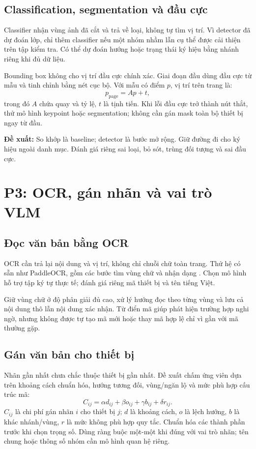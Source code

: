 \documentclass[11pt,a4paper]{article}
\newcommand{\decision}[1]{\par\smallskip\noindent\colorbox{Pale}{\parbox{\dimexpr\linewidth-2\fboxsep\relax}{\textbf{Đề xuất:} #1}}\par\smallskip}
\newcommand{\code}[1]{\texttt{\detokenize{#1}}}
\begin{document}
\subsection{Classification, segmentation và đầu cực}
Classifier nhận vùng ảnh đã cắt và trả về loại, không tự tìm vị trí. Vì detector đã dự đoán lớp, chỉ thêm classifier nếu một nhóm nhầm lẫn cụ thể được cải thiện trên tập kiểm tra. Có thể dự đoán hướng hoặc trạng thái ký hiệu bằng nhánh riêng khi đủ dữ liệu.

Bounding box không cho vị trí đầu cực chính xác. Giai đoạn đầu dùng đầu cực từ mẫu và tinh chỉnh bằng nét cục bộ. Với mẫu có điểm $p$, vị trí trên trang là:
\begin{equation}
p_{\mathrm{page}}=A p+t,
\end{equation}
trong đó $A$ chứa quay và tỷ lệ, $t$ là tịnh tiến. Khi lỗi đầu cực trở thành nút thắt, thử mô hình keypoint hoặc segmentation; không cần gán mask toàn bộ thiết bị ngay từ đầu.

\decision{So khớp là baseline; detector là bước mở rộng. Giữ đường đi \code{unknown} cho ký hiệu ngoài danh mục. Đánh giá riêng sai loại, bỏ sót, trùng đối tượng và sai đầu cực.}

\clearpage
\section{P3: OCR, gán nhãn và vai trò VLM}
\subsection{Đọc văn bản bằng OCR}
OCR cần trả lại nội dung và vị trí, không chỉ chuỗi chữ toàn trang. Thử hệ có sẵn như PaddleOCR, gồm các bước tìm vùng chữ và nhận dạng \cite{ppocr,paddle}. Chọn mô hình hỗ trợ tập ký tự thực tế; đánh giá riêng mã thiết bị và tên tiếng Việt.

Giữ vùng chữ ở độ phân giải đủ cao, xử lý hướng đọc theo từng vùng và lưu cả nội dung thô lẫn nội dung xác nhận. Từ điển mã giúp phát hiện trường hợp nghi ngờ, nhưng không được tự tạo mã mới hoặc thay mã hợp lệ chỉ vì gần với mã thường gặp.

\subsection{Gán văn bản cho thiết bị}
Nhãn gần nhất chưa chắc thuộc thiết bị gần nhất. Đề xuất chấm ứng viên dựa trên khoảng cách chuẩn hóa, hướng tương đối, vùng/ngăn lộ và mức phù hợp cấu trúc mã:
\begin{equation}
C_{ij}=\alpha d_{ij}+\beta o_{ij}+\gamma b_{ij}+\delta r_{ij}.
\end{equation}
$C_{ij}$ là chi phí gán nhãn $i$ cho thiết bị $j$; $d$ là khoảng cách, $o$ là lệch hướng, $b$ là khác nhánh/vùng, $r$ là mức không phù hợp quy tắc. Chuẩn hóa các thành phần trước khi chọn trọng số. Dùng ràng buộc một-một khi đúng với vai trò nhãn; tên chung hoặc thông số nhóm cần mô hình quan hệ riêng.
\end{document}
